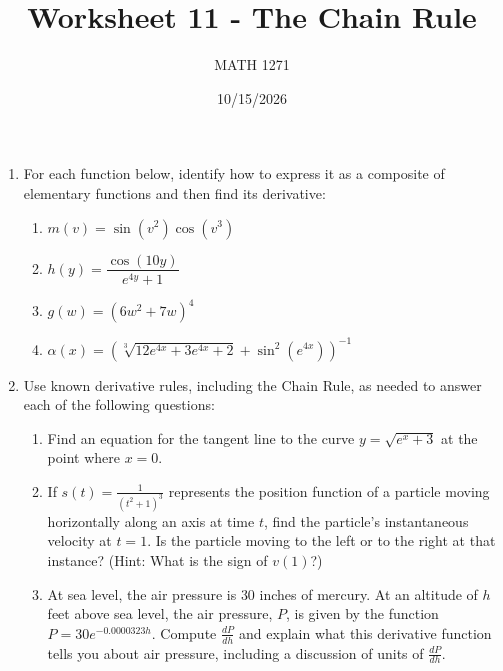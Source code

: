 \documentclass[12pt]{exam}
\title{Worksheet 11 - The Chain Rule}
\author{MATH 1271}
\date{10/15/2026}
\begin{document}
\newpage
\maketitle

\begin{enumerate}

\item For each function below, identify how to express it as a composite of elementary functions and then find its derivative:

\begin{enumerate}


\item $m(v)=\sin(v^2)\cos(v^3)$

\vfill

\item $h(y)=\dfrac{\cos(10y)}{e^{4y}+1}$

\vfill

\item $g(w) = (6w^2 + 7w)^4$

  \vfill

\item $\alpha(x) = \left(\sqrt[3]{12e^{4x} + 3e^{4x} + 2} + \sin^2(e^{4x})\right)^{-1}$
  \vfill
\end{enumerate}

\newpage


\item Use known derivative rules, including the Chain Rule, as needed to answer each of the following questions:

\begin{enumerate}

\item Find an equation for the tangent line to the curve $y=\sqrt{e^x+3}$ at the point where $x=0$.

\vfill

\item If $s(t)=\frac{1}{(t^2+1)^3}$ represents the position function of a particle moving horizontally along an axis at time $t$, find the particle's instantaneous velocity at $t=1$. Is the particle moving to the left or to the right at that instance? (Hint: What is the sign of $v(1)$?)

\vfill

\item At sea level, the air pressure is $30$ inches of mercury. At an altitude of $h$ feet above sea level, the air pressure, $P$, is given by the function $P=30e^{-0.0000323h}$. Compute $\frac{dP}{dh}$ and explain what this derivative function tells you about air pressure, including a discussion of units of $\frac{dP}{dh}$.


\end{enumerate}
\end{enumerate}
\end{document}

